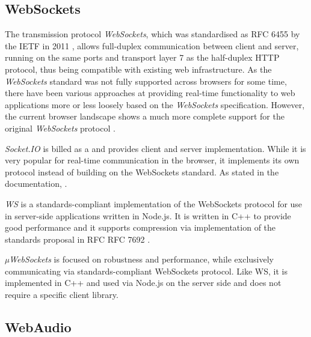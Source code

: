 \subsection{WebSockets}

The transmission protocol \emph{WebSockets}, which was standardised as \ac{RFC} 6455 by the \ac{IETF} in 2011 \parencite{webSocketsProtocolRfc}, allows full-duplex communication between client and server, running on the same ports and transport layer 7 as the half-duplex \ac{HTTP} protocol, thus being compatible with existing web infrastructure. As the \emph{WebSockets} standard was not fully supported across browsers for some time, there have been various approaches at providing real-time functionality to web applications more or less loosely based on the \emph{WebSockets} specification. However, the current browser landscape shows a much more complete support for the original \emph{WebSockets} protocol \parencite{canIUseWebSockets}.



\emph{Socket.IO} is billed as a  and provides client and server implementation. While it is very popular for real-time communication in the browser, it implements its own protocol instead of building on the WebSockets standard. As stated in the documentation, .

\emph{WS} is a standards-compliant implementation of the WebSockets protocol for use in server-side applications written in Node.js. It is written in C++ to provide good performance and it supports compression via implementation of the standards proposal in \ac{RFC} RFC 7692 .

\emph{µWebSockets} is focused on robustness and performance, while exclusively communicating via standards-compliant WebSockets protocol. Like WS, it is implemented in C++ and used via Node.js on the server side and does not require a specific client library.

\subsection{WebAudio}

